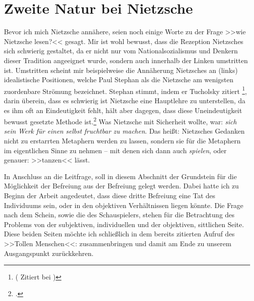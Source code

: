 \documentclass[12pt, a4paper, openany]{report}
\begin{document}
\section{Zweite Natur bei Nietzsche}\label{abschnitt_2}
Bevor ich mich Nietzsche annähere, seien noch einige Worte zu der Frage >>wie Nietzsche lesen?<< gesagt.
Mir ist wohl bewusst, dass die Rezeption Nietzsches sich schwierig gestaltet, da er nicht nur vom Nationalsozialismus und Denkern dieser Tradition angeeignet wurde, sondern auch innerhalb der Linken umstritten ist.
Umstritten scheint mir beispielweise die Annäherung Nietzsches an (links) idealistische Positionen, welche Paul Stephan als die Nietzsche am wenigsten zuordenbare Strömung bezeichnet.
Stephan stimmt, indem er Tucholsky zitiert%
 \footnote{
     ( Zitiert bei \cite[][17]{stephan_nietzscheanismus_2019})
},
darin überein, dass es schwierig ist Nietzsche eine Hauptlehre zu unterstellen, da es ihm oft an Eindeutigkeit fehlt, hält aber dagegen, dass diese Uneindeutigkeit bewusst gesetzte Methode ist.\footcite[Vgl.][18]{stephan_nietzscheanismus_2019}
Was Nietzsche mit Sicherheit wollte, war: \emph{sich sein Werk für einen selbst fruchtbar zu machen}. 
Das heißt: Nietzsches Gedanken nicht zu erstarrten Metaphern werden zu lassen, sondern sie für die Metaphern im eigentlichen Sinne zu nehmen -- mit denen sich dann auch \emph{spielen}, oder genauer: >>tanzen<< lässt.

In Anschluss an die Leitfrage, soll in diesem Abschnitt der Grundstein für die Möglichkeit der Befreiung aus der Befreiung gelegt werden.
Dabei hatte ich zu Beginn der Arbeit angedeutet, dass diese dritte Befreiung eine Tat des Individuums sein, oder in den objektiven Verhältnissen liegen könnte. 
Die Frage nach dem Schein, sowie die des Schauspielers, stehen für die Betrachtung des Problems von der subjektiven, individuellen und der objektiven, sittlichen Seite. 
Diese beiden Seiten möchte ich schließlich in dem bereits zitierten Aufruf des >>Tollen Menschen<<:  zusammenbringen und damit am Ende zu unserem Ausgangspunkt zurückkehren. 
\end{document}
